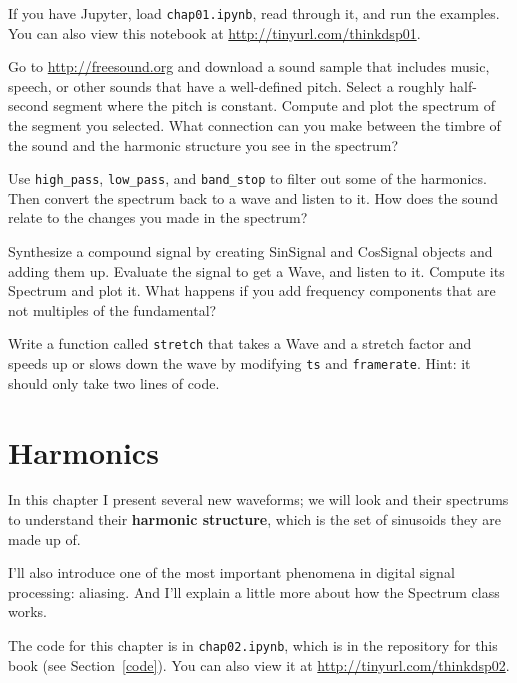 \documentclass[12pt]{book}
\begin{document}
\begin{exercise}
If you have Jupyter, load {\tt chap01.ipynb}, read through it, and run
the examples.  You can also view this notebook at
\url{http://tinyurl.com/thinkdsp01}.
\end{exercise}


\begin{exercise}
Go to \url{http://freesound.org} and download a sound sample that
includes music, speech, or other sounds that have a well-defined pitch.
Select a roughly half-second segment where the pitch is
constant.  Compute and plot the spectrum of the segment you selected.
What connection can you make between the timbre of the sound and the
harmonic structure you see in the spectrum?

Use \verb"high_pass", \verb"low_pass", and \verb"band_stop" to
filter out some of the harmonics.  Then convert the spectrum back
to a wave and listen to it.  How does the sound relate to the
changes you made in the spectrum?
\end{exercise}


\begin{exercise}
Synthesize a compound signal by creating SinSignal and CosSignal
objects and adding them up.  Evaluate the signal to get a Wave,
and listen to it.  Compute its Spectrum and plot it.
What happens if you add frequency
components that are not multiples of the fundamental?
\end{exercise}


\begin{exercise}
Write a function called {\tt stretch} that takes a Wave and a stretch
factor and speeds up or slows down the wave by modifying {\tt ts} and
{\tt framerate}.  Hint: it should only take two lines of code.
\end{exercise}


\chapter{Harmonics}
\label{harmonics}

In this chapter I present several new waveforms; we will look and
their spectrums to understand their {\bf harmonic structure}, which is
the set of sinusoids they are made up of.

I'll also introduce one of the most important phenomena in digital
signal processing: aliasing.  And I'll explain a little more about how
the Spectrum class works.

The code for this chapter is in {\tt chap02.ipynb}, which is in the
repository for this book (see Section~\ref{code}).
You can also view it at \url{http://tinyurl.com/thinkdsp02}.
\end{document}
